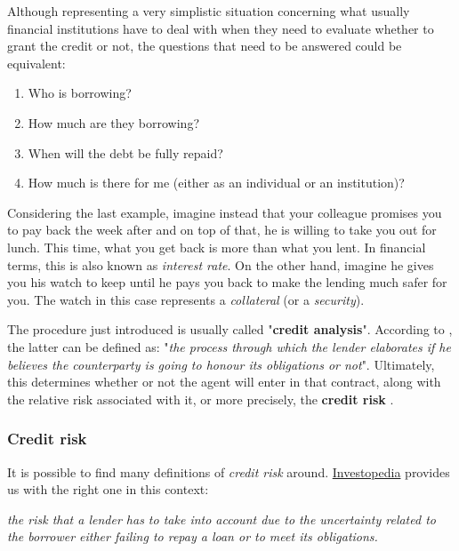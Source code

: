 \documentclass[a4paper,12pt]{article}
\begin{document}
    Although representing a very simplistic situation concerning what usually financial institutions have to deal with 
    when they need to evaluate whether to grant the credit or not, the questions that need to be answered could be equivalent: 

        \begin{enumerate}
            \item Who is borrowing?
            \item How much are they borrowing?
            \item When will the debt be fully repaid?
            \item How much is there for me (either as an individual or an institution)?
        \end{enumerate}
    
    Considering the last example, imagine instead that your colleague promises you to pay back the week after and on top of that,
    he is willing to take you out for lunch. This time, what you get back is more than what you lent. 
    In financial terms, this is also known as \textit{interest rate}. On the other hand, imagine he gives you his watch to keep 
    until he pays you back to make the lending much safer for you. The watch in this case represents a \textit{collateral} 
    (or a \textit{security}).

    The procedure just introduced is usually called "\textbf{credit analysis}". According to \cite{creditanalysis}, 
    the latter can be defined as: "\textit{the process through which the lender elaborates if he believes the counterparty is going to honour its obligations or not}". 
    Ultimately, this determines whether or not the agent will enter in that contract, 
    along with the relative risk associated with it, or more precisely, the \textbf{credit risk} \cite{creditriskprinciple}.

    \subsubsection{Credit risk}

    It is possible to find many definitions of \textit{credit risk} around.
    \href{https://www.investopedia.com/}{Investopedia} provides us with the right one in this context:
 
        \begin{definition}
            \textit{the risk that a lender has to take into account due to the uncertainty related to the borrower either failing to repay a loan or to meet its obligations.} \cite{investopediacreditrisk}
        \end{definition}
\end{document}
